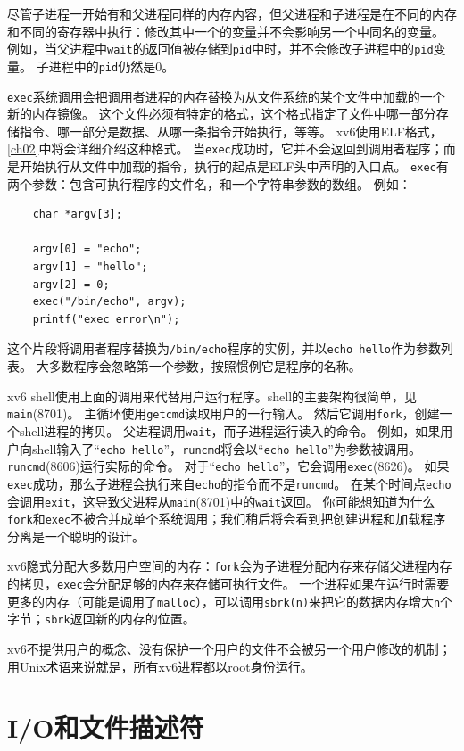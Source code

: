 尽管子进程一开始有和父进程同样的内存内容，但父进程和子进程是在不同的内存和不同的寄存器中执行：修改其中一个的变量并不会影响另一个中同名的变量。
例如，当父进程中\texttt{wait}的返回值被存储到\texttt{pid}中时，并不会修改子进程中的\texttt{pid}变量。
子进程中的\texttt{pid}仍然是0。

\texttt{exec}系统调用会把调用者进程的内存替换为从文件系统的某个文件中加载的一个新的内存镜像。
这个文件必须有特定的格式，这个格式指定了文件中哪一部分存储指令、哪一部分是数据、从哪一条指令开始执行，等等。
xv6使用ELF格式，\autoref{ch02}中将会详细介绍这种格式。
当\texttt{exec}成功时，它并不会返回到调用者程序；而是开始执行从文件中加载的指令，执行的起点是ELF头中声明的入口点。
\texttt{exec}有两个参数：包含可执行程序的文件名，和一个字符串参数的数组。
例如：
\begin{lstlisting}
    char *argv[3];

    argv[0] = "echo";
    argv[1] = "hello";
    argv[2] = 0;
    exec("/bin/echo", argv);
    printf("exec error\n");
\end{lstlisting}

这个片段将调用者程序替换为\texttt{/bin/echo}程序的实例，并以\texttt{echo hello}作为参数列表。
大多数程序会忽略第一个参数，按照惯例它是程序的名称。

xv6 shell使用上面的调用来代替用户运行程序。shell的主要架构很简单，见\texttt{main}(8701)。
主循环使用\texttt{getcmd}读取用户的一行输入。
然后它调用\texttt{fork}，创建一个shell进程的拷贝。
父进程调用\texttt{wait}，而子进程运行读入的命令。
例如，如果用户向shell输入了“\texttt{echo hello}”，\texttt{runcmd}将会以“\texttt{echo hello}”为参数被调用。
\texttt{runcmd}(8606)运行实际的命令。
对于“\texttt{echo hello}”，它会调用\texttt{exec}(8626)。
如果\texttt{exec}成功，那么子进程会执行来自\texttt{echo}的指令而不是\texttt{runcmd}。
在某个时间点\texttt{echo}会调用\texttt{exit}，这导致父进程从\texttt{main}(8701)中的\texttt{wait}返回。
你可能想知道为什么\texttt{fork}和\texttt{exec}不被合并成单个系统调用；我们稍后将会看到把创建进程和加载程序分离是一个聪明的设计。

xv6隐式分配大多数用户空间的内存：\texttt{fork}会为子进程分配内存来存储父进程内存的拷贝，\texttt{exec}会分配足够的内存来存储可执行文件。
一个进程如果在运行时需要更多的内存（可能是调用了\texttt{malloc}），可以调用\texttt{sbrk(n)}来把它的数据内存增大\texttt{n}个字节；\texttt{sbrk}返回新的内存的位置。

xv6不提供用户的概念、没有保护一个用户的文件不会被另一个用户修改的机制；用Unix术语来说就是，所有xv6进程都以root身份运行。

\section{I/O和文件描述符}

